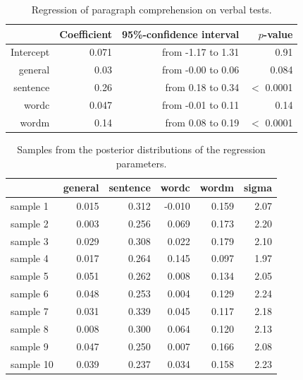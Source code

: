 \documentclass[11pt,a4paper,twoside]{book}
\newenvironment{knitrout}{}{} %
\begin{document}
\begin{table}[!h]
\centering
\caption{Regression of paragraph comprehension on verbal tests.} 
\label{tbl:empirical.reg}
\begingroup\footnotesize
\begin{tabular}{rrrr}
  \hline
 & Coefficient & 95\%-confidence interval & $p$-value \\ 
  \hline
Intercept & 0.071 & from -1.17 to 1.31 & 0.91 \\ 
  general & 0.03 & from -0.00 to 0.06 & 0.084 \\ 
  sentence & 0.26 & from 0.18 to 0.34 & $<$ 0.0001 \\ 
  wordc & 0.047 & from -0.01 to 0.11 & 0.14 \\ 
  wordm & 0.14 & from 0.08 to 0.19 & $<$ 0.0001 \\ 
   \hline
\end{tabular}
\endgroup
\end{table}


\begin{knitrout}
\color{fgcolor}\begin{table}

\caption{\label{tab:empirical.data.postsample2}Samples from the posterior distributions of the regression parameters.}
\centering
\begin{tabular}[t]{lrrrrr}
\toprule
  & general & sentence & wordc & wordm & sigma\\
\midrule
sample 1 & 0.015 & 0.312 & -0.010 & 0.159 & 2.07\\
sample 2 & 0.003 & 0.256 & 0.069 & 0.173 & 2.20\\
sample 3 & 0.029 & 0.308 & 0.022 & 0.179 & 2.10\\
sample 4 & 0.017 & 0.264 & 0.145 & 0.097 & 1.97\\
sample 5 & 0.051 & 0.262 & 0.008 & 0.134 & 2.05\\
sample 6 & 0.048 & 0.253 & 0.004 & 0.129 & 2.24\\
sample 7 & 0.031 & 0.339 & 0.045 & 0.117 & 2.18\\
sample 8 & 0.008 & 0.300 & 0.064 & 0.120 & 2.13\\
sample 9 & 0.047 & 0.250 & 0.007 & 0.166 & 2.08\\
sample 10 & 0.039 & 0.237 & 0.034 & 0.158 & 2.23\\
\bottomrule
\end{tabular}
\end{table}


\end{knitrout}
\end{document}
